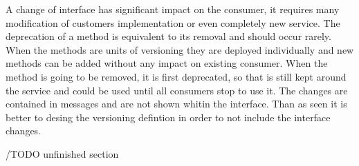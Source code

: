 
A change of interface has significant impact on the consumer, it requires many modification of customers implementation or even completely new service. The deprecation of a method is equivalent to its removal and should occur rarely.
When the methods are units of versioning they are deployed individually and new methods can be added without any impact on existing consumer. When the method is going to be removed, it is first deprecated, so that is still kept around the service and could be used until all consumers stop to use it. The changes are contained in messages and are not shown whitin the interface.
Than as seen it is better to desing the versioning defintion in order to not include the interface changes.

/TODO unfinished section




